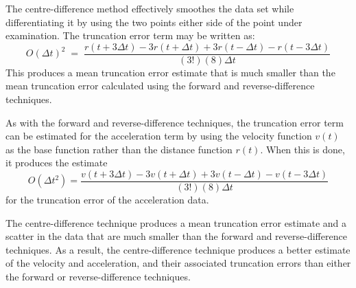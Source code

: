 \documentclass[namedreferences]{SolarPhysics}
\begin{document}
\begin{article}


The centre-difference method effectively smoothes the data set while differentiating it by using the two points either side of the point under examination. The truncation error term may be written as:
\begin{equation}
O(\Delta t)^{2} \; = \; \frac{r(t + 3\Delta t) - 3r(t + \Delta t) + 3r(t - \Delta t) - r(t - 3\Delta t)}{(3!)(8)\Delta t}
\end{equation}
This produces a mean truncation error estimate that is much smaller than the mean truncation error calculated using the forward and reverse-difference techniques.

As with the forward and reverse-difference techniques, the truncation error term can be estimated for the acceleration term by using the velocity function $v(t)$ as the base function rather than the distance function $r(t)$. When this is done, it produces the estimate
\begin{equation}
O(\Delta t^{2}) = \frac{v(t + 3\Delta t) - 3v(t + \Delta t) + 3v(t - \Delta t) - v(t - 3\Delta t)}{(3!)(8)\Delta t}
\end{equation}
for the truncation error of the acceleration data. 

The centre-difference technique produces a mean truncation error estimate and a scatter in the data that are much smaller than the forward and reverse-difference techniques. As a result, the centre-difference technique produces a better estimate of the velocity and acceleration, and their associated truncation errors than either the forward or reverse-difference techniques.



\end{article}
\end{document}
